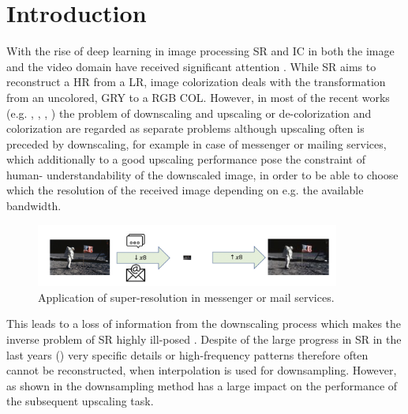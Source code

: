 \newpage
\chapter{Introduction}
\label{sec:Introduction}
With the rise of deep learning in image processing \acf{SR} and \acf{IC} in both the image and the video domain have received significant attention \cite{DLFISRAS}. While SR aims to reconstruct a \ac{HR} from a \ac{LR}, image colorization deals with the transformation from an uncolored, \ac{GRY} to a RGB \ac{COL}. However, in most of the recent works (e.g. \cite{AFPATSISR}, \cite{ESRGAN}, \cite{RBPNFVSR}, \cite{LFVSRTHROFE}) the problem of downscaling and upscaling or de-colorization and colorization are regarded as separate problems although upscaling often is preceded by downscaling, for example in case of messenger or mailing services, which additionally to a good upscaling performance pose the constraint of human- 	understandability of the downscaled image, in order to be able to choose which the resolution of the received image depending on e.g. the available bandwidth. 

\begin{figure}[!htbp]
\centering
\includegraphics[width=10cm]{figures/tad_application.png}
\caption{Application of super-resolution in messenger or mail services.}
\label{fig:tad_application}
\end{figure}

This leads to a loss of information from the downscaling process which makes the inverse problem of SR highly ill-posed \cite{TAID}. Despite of the large progress in SR in the last years (\cite{DLFISRAS}) very specific details or high-frequency patterns therefore often cannot be reconstructed, when interpolation is used for downsampling. However, as shown in  the downsampling method has a large impact on the performance of the subsequent upscaling task.

